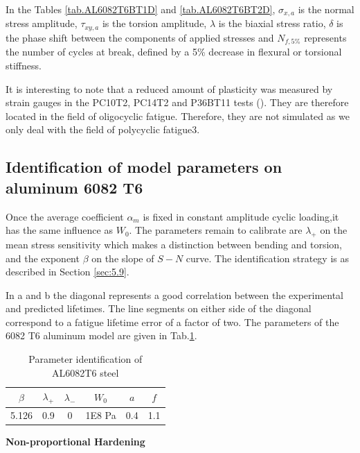 In the Tables \ref{tab.AL6082T6BT1D} and \ref{tab.AL6082T6BT2D}, $\sigma_{x,a}$ is the normal stress amplitude, $\tau_{xy,a}$ is the torsion amplitude, $\lambda$ is the biaxial stress ratio, $\delta$ is the phase shift between the components of applied stresses and $N_{f,5\%}$ represents the number of cycles at break, defined by a 5\% decrease in flexural or torsional stiffness.

It is interesting to note that a reduced amount of plasticity was measured by strain gauges in the PC10T2, PC14T2 and P36BT11 tests (\cite{susmel2003multiaxial}). They are therefore located in the field of oligocyclic fatigue. Therefore, they are not simulated as we only deal with the field of polycyclic fatigue3.

\newpage
\subsection{Identification of model parameters on aluminum 6082 T6}


Once the average coefficient $\alpha_m$ is fixed in constant amplitude cyclic loading,it has the same influence as $W_0$. The parameters remain to calibrate are $\lambda_{+}$ on the mean stress sensitivity which makes a distinction between bending and torsion, and the exponent $\beta$ on the slope of $S-N$ curve. The identification strategy is as described in Section \ref{sec:5.9}.

In a and b the diagonal represents a good correlation between the experimental and predicted lifetimes. The line segments on either side of the diagonal correspond to a fatigue lifetime error of a factor of two. The parameters of the 6082 T6 aluminum model are given in Tab.\ref{tab.6082T6para}.

\begin{table}[!h]
\centering
\begin{tabular}{|c|c|c|c|c|c|}
	\hline
	\textbf{$\beta$} & \textbf{$\lambda_+$} & \textbf{$\lambda_-$} & \textbf{$W_0$} & \textbf{$a$}  & \textbf{$f$}\\ \hline
	5.126     & 0.9 &0         &1E8 Pa  & 0.4 & 1.1   \\ \hline
\end{tabular}
\caption{Parameter identification of AL6082T6 steel}
\label{tab.6082T6para}
\end{table}

\vspace{6pt}
\textbf{Non-proportional Hardening}
\vspace{6pt}

